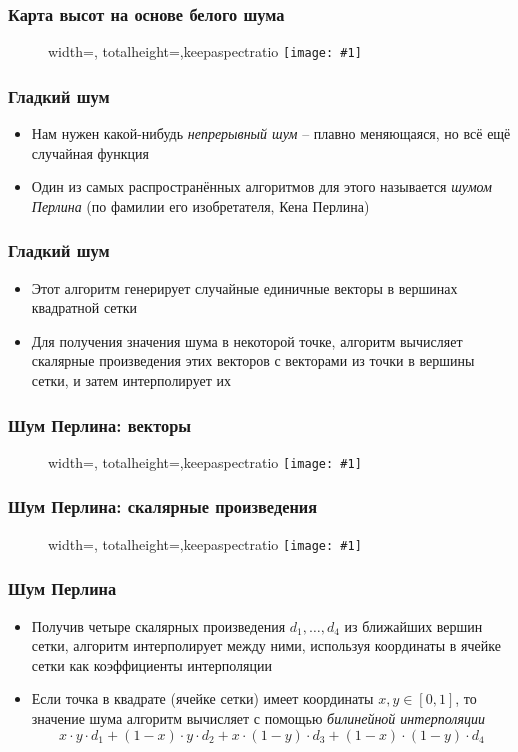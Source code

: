 \documentclass[10pt]{beamer}
\newcommand{\slideimage}[1]{
  \begin{figure}
    \begin{adjustbox}{width=\textwidth, totalheight=\textheight-2\baselineskip-2\baselineskip,keepaspectratio}
      \texttt{[image: \#1]}
    \end{adjustbox}
  \end{figure}
}
\begin{document}
\begin{frame}
\frametitle{Карта высот на основе белого шума}
\slideimage{white-noise-terrain.png}
\end{frame}

\begin{frame}
\frametitle{Гладкий шум}
\begin{itemize}
\item Нам нужен какой-нибудь \textit{непрерывный шум} -- плавно меняющаяся, но всё ещё случайная функция
\pause
\item Один из самых распространённых алгоритмов для этого называется \textit{шумом Перлина} (по фамилии его изобретателя, Кена Перлина)
\end{itemize}
\end{frame}

\begin{frame}
\frametitle{Гладкий шум}
\begin{itemize}
\item Этот алгоритм генерирует случайные единичные векторы в вершинах квадратной сетки
\pause
\item Для получения значения шума в некоторой точке, алгоритм вычисляет скалярные произведения этих векторов с векторами из точки в вершины сетки, и затем интерполирует их
\end{itemize}
\end{frame}

\begin{frame}
\frametitle{Шум Перлина: векторы}
\slideimage{perlin-noise-vectors.png}
\end{frame}

\begin{frame}
\frametitle{Шум Перлина: скалярные произведения}
\slideimage{perlin-noise-dot.png}
\end{frame}

\begin{frame}
\frametitle{Шум Перлина}
\begin{itemize}
\item Получив четыре скалярных произведения \begin{math}d_1,\dots,d_4\end{math} из ближайших вершин сетки, алгоритм интерполирует между ними, используя координаты в ячейке сетки как коэффициенты интерполяции
\pause
\item Если точка в квадрате (ячейке сетки) имеет координаты \begin{math}x, y \in [0, 1]\end{math}, то значение шума алгоритм вычисляет с помощью \textit{билинейной интерполяции}
\begin{equation*}
x\cdot y\cdot d_1 + (1-x)\cdot y \cdot d_2 + x \cdot (1-y) \cdot d_3 + (1-x) \cdot (1-y)\cdot d_4
\end{equation*}
\end{itemize}
\end{frame}
\end{document}
